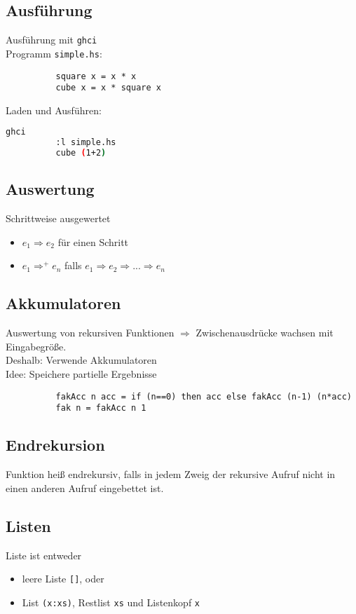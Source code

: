 \documentclass[10pt,a4paper]{article}
\def\code#1{\texttt{#1}}
\begin{document}
        \subsection{Ausführung}
        Ausführung mit \code{ghci}\\
        Programm \code{simple.hs}:
        \begin{lstlisting}
          square x = x * x
          cube x = x * square x
        \end{lstlisting}
        Laden und Ausführen:
        \begin{lstlisting}[language=bash]
          ghci
          :l simple.hs
          cube (1+2)
        \end{lstlisting}

        \subsection{Auswertung}
        Schrittweise ausgewertet
        \begin{itemize}
          \item \(e_1 \Rightarrow e_2\) für einen Schritt
          \item \(e_1 \Rightarrow^+ e_n \) falls \(e_1 \Rightarrow e_2 \Rightarrow ... \Rightarrow e_n\)
        \end{itemize}
        
        \subsection{Akkumulatoren}
        Auswertung von rekursiven Funktionen \(\Rightarrow\) Zwischenausdrücke wachsen mit Eingabegröße.\\
        Deshalb: Verwende Akkumulatoren\\
        Idee: Speichere partielle Ergebnisse
        \begin{lstlisting}
          fakAcc n acc = if (n==0) then acc else fakAcc (n-1) (n*acc)
          fak n = fakAcc n 1
        \end{lstlisting}

        \subsection{Endrekursion}
        Funktion heiß endrekursiv, falls in jedem Zweig der rekursive Aufruf nicht in einen anderen Aufruf eingebettet ist.

        \subsection{Listen}
        Liste ist entweder
        \begin{itemize}
          \item leere Liste \code{[]}, oder
          \item List \code{(x:xs)}, Restlist \code{xs} und Listenkopf \code{x}
        \end{itemize}
\end{document}
